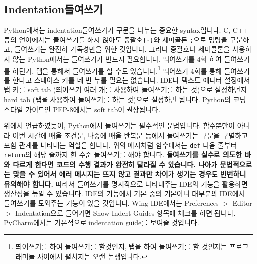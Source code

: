 \documentclass[../main.tex]{subfiles}
\begin{document}
\subsection{Indentation들여쓰기}
Python에서는 indentation들여쓰기가 구문을 나누는 중요한 syntax입니다.  C, C++
등의 언어에서는 들여쓰기를 하지 않아도 중괄호\verb|{·}|와
세미콜론 \verb|;|으로 명령을 구분하고, 들여쓰기는 완전히 가독성만을 위한
것입니다.  그러나 중괄호나 세미콜론을 사용하지 않는 Python에서는 들여쓰기가
반드시 필요합니다. 띄여쓰기를 4회 하여 들여쓰기를 하던가, 탭을 통해서 들여쓰기를
할 수도 있습니다.\footnote{띄어쓰기를 하여 들여쓰기를 할것인지, 탭을 하여
들여쓰기를 할 것인지는 프로그래머들 사이에서 펼쳐지는 오랜 논쟁입니다.}
띄어쓰기 4회를 통해 들여쓰기를 한다고 스페이스 키를 네 번 누를 필요는 없습니다.
IDE나 텍스트 에디터 설정에서 탭 키를 soft tab (띄어쓰기 여러 개를 사용하여
들여쓰기를 하는 것)으로 설정하던지 hard tab (탭을 사용하여 들여쓰기를 하는
것)으로 설정하면 됩니다.  Python의 코딩 스타일 가이드인 PEP-8에서는 soft tab이
권장됩니다.

위에서 언급하였듯이, Python에서 들여쓰기는 필수적인 문법입니다.  함수뿐만이
아니라 이번 시간에 배울 조건문, 나중에 배울 반복문 등에서 들여쓰기는 구문을
구별하고 포함 관계를 나타내는 역할을 합니다.  위의 예시처럼 함수에서는
\texttt{def} 다음 줄부터 \texttt{return}의 해당 줄까지 한 수준 들여쓰기를 해야
합니다.  \textbf{들여쓰기를 실수로 의도한 바와 다르게 한다면 코드의 수행 결과가
  완전히 달라질 수 있습니다.  나아가 문법적으로는 맞을 수 있어서 에러 메시지는
뜨지 않고 결과만 차이가 생기는 경우도 빈번하니 유의해야 합니다.} 따라서
들여쓰기를 명시적으로 나타내주는 IDE의 기능을 활용하면 생산성을 높일 수
있습니다.  IDE의 기능에서 기본 중의 기본이니 대부분의 IDE에서 들여쓰기를
도와주는 기능이 있을 것입니다.  Wing IDE에서는 Preferences $>$ Editor $>$
Indentation으로 들어가면 Show Indent Guides 항목에 체크를 하면 됩니다.
PyCharm에서는 기본적으로 indentation guide를 보여줄 것입니다.
\end{document}
